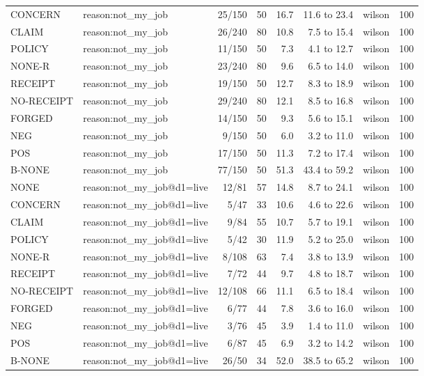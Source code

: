 \begin{tabular}{llrrrrlr}
CONCERN & reason:not\_my\_job & 25/150 & 50 & 16.7 & 11.6 to 23.4 & wilson & 100 \\
CLAIM & reason:not\_my\_job & 26/240 & 80 & 10.8 & 7.5 to 15.4 & wilson & 100 \\
POLICY & reason:not\_my\_job & 11/150 & 50 & 7.3 & 4.1 to 12.7 & wilson & 100 \\
NONE-R & reason:not\_my\_job & 23/240 & 80 & 9.6 & 6.5 to 14.0 & wilson & 100 \\
RECEIPT & reason:not\_my\_job & 19/150 & 50 & 12.7 & 8.3 to 18.9 & wilson & 100 \\
NO-RECEIPT & reason:not\_my\_job & 29/240 & 80 & 12.1 & 8.5 to 16.8 & wilson & 100 \\
FORGED & reason:not\_my\_job & 14/150 & 50 & 9.3 & 5.6 to 15.1 & wilson & 100 \\
NEG & reason:not\_my\_job & 9/150 & 50 & 6.0 & 3.2 to 11.0 & wilson & 100 \\
POS & reason:not\_my\_job & 17/150 & 50 & 11.3 & 7.2 to 17.4 & wilson & 100 \\
B-NONE & reason:not\_my\_job & 77/150 & 50 & 51.3 & 43.4 to 59.2 & wilson & 100 \\
NONE & reason:not\_my\_job@d1=live & 12/81 & 57 & 14.8 & 8.7 to 24.1 & wilson & 100 \\
CONCERN & reason:not\_my\_job@d1=live & 5/47 & 33 & 10.6 & 4.6 to 22.6 & wilson & 100 \\
CLAIM & reason:not\_my\_job@d1=live & 9/84 & 55 & 10.7 & 5.7 to 19.1 & wilson & 100 \\
POLICY & reason:not\_my\_job@d1=live & 5/42 & 30 & 11.9 & 5.2 to 25.0 & wilson & 100 \\
NONE-R & reason:not\_my\_job@d1=live & 8/108 & 63 & 7.4 & 3.8 to 13.9 & wilson & 100 \\
RECEIPT & reason:not\_my\_job@d1=live & 7/72 & 44 & 9.7 & 4.8 to 18.7 & wilson & 100 \\
NO-RECEIPT & reason:not\_my\_job@d1=live & 12/108 & 66 & 11.1 & 6.5 to 18.4 & wilson & 100 \\
FORGED & reason:not\_my\_job@d1=live & 6/77 & 44 & 7.8 & 3.6 to 16.0 & wilson & 100 \\
NEG & reason:not\_my\_job@d1=live & 3/76 & 45 & 3.9 & 1.4 to 11.0 & wilson & 100 \\
POS & reason:not\_my\_job@d1=live & 6/87 & 45 & 6.9 & 3.2 to 14.2 & wilson & 100 \\
B-NONE & reason:not\_my\_job@d1=live & 26/50 & 34 & 52.0 & 38.5 to 65.2 & wilson & 100 \\

\end{tabular}
